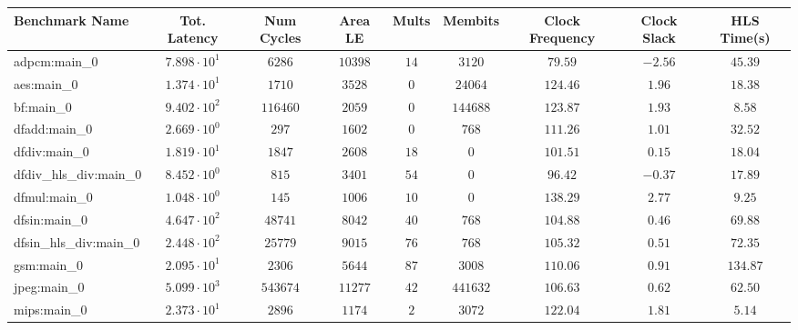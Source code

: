 \begin{tabular}{|l|c|c|c|c|c|c|c|c|}
\hline
Benchmark Name          & Tot. Latency           & Num Cycles & Area LE   & Mults   & Membits    & Clock Frequency & Clock Slack & HLS Time(s) \\
\hline
adpcm:main\_0           & $ 7.898 \cdot 10^{1} $ & $ 6286   $ & $ 10398 $ & $ 14  $ & $ 3120   $ & $ 79.59       $ & $ -2.56   $ & $ 45.39   $ \\
aes:main\_0             & $ 1.374 \cdot 10^{1} $ & $ 1710   $ & $ 3528  $ & $ 0   $ & $ 24064  $ & $ 124.46      $ & $ 1.96    $ & $ 18.38   $ \\
bf:main\_0              & $ 9.402 \cdot 10^{2} $ & $ 116460 $ & $ 2059  $ & $ 0   $ & $ 144688 $ & $ 123.87      $ & $ 1.93    $ & $ 8.58    $ \\
dfadd:main\_0           & $ 2.669 \cdot 10^{0} $ & $ 297    $ & $ 1602  $ & $ 0   $ & $ 768    $ & $ 111.26      $ & $ 1.01    $ & $ 32.52   $ \\
dfdiv:main\_0           & $ 1.819 \cdot 10^{1} $ & $ 1847   $ & $ 2608  $ & $ 18  $ & $ 0      $ & $ 101.51      $ & $ 0.15    $ & $ 18.04   $ \\
dfdiv\_hls\_div:main\_0 & $ 8.452 \cdot 10^{0} $ & $ 815    $ & $ 3401  $ & $ 54  $ & $ 0      $ & $ 96.42       $ & $ -0.37   $ & $ 17.89   $ \\
dfmul:main\_0           & $ 1.048 \cdot 10^{0} $ & $ 145    $ & $ 1006  $ & $ 10  $ & $ 0      $ & $ 138.29      $ & $ 2.77    $ & $ 9.25    $ \\
dfsin:main\_0           & $ 4.647 \cdot 10^{2} $ & $ 48741  $ & $ 8042  $ & $ 40  $ & $ 768    $ & $ 104.88      $ & $ 0.46    $ & $ 69.88   $ \\
dfsin\_hls\_div:main\_0 & $ 2.448 \cdot 10^{2} $ & $ 25779  $ & $ 9015  $ & $ 76  $ & $ 768    $ & $ 105.32      $ & $ 0.51    $ & $ 72.35   $ \\
gsm:main\_0             & $ 2.095 \cdot 10^{1} $ & $ 2306   $ & $ 5644  $ & $ 87  $ & $ 3008   $ & $ 110.06      $ & $ 0.91    $ & $ 134.87  $ \\
jpeg:main\_0            & $ 5.099 \cdot 10^{3} $ & $ 543674 $ & $ 11277 $ & $ 42  $ & $ 441632 $ & $ 106.63      $ & $ 0.62    $ & $ 62.50   $ \\
mips:main\_0            & $ 2.373 \cdot 10^{1} $ & $ 2896   $ & $ 1174  $ & $ 2   $ & $ 3072   $ & $ 122.04      $ & $ 1.81    $ & $ 5.14    $ \\

\end{tabular}
